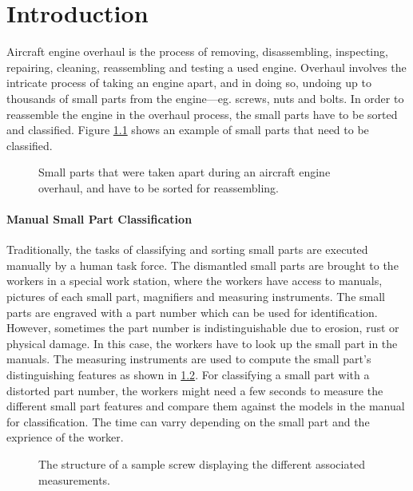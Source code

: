 \chapter{Introduction}\label{ch:introduction}

Aircraft engine overhaul is the process of removing, disassembling, inspecting, repairing, cleaning, reassembling and testing a used engine. Overhaul involves the intricate process of taking an engine apart, and in doing so, undoing up to thousands of small parts from the engine—eg. screws, nuts and bolts. In order to reassemble the engine in the overhaul process, the small parts have to be sorted and classified. Figure \ref{fig:unclassified_small_parts} shows an example of small parts that need to be classified.

\begin{figure}[H]
\centering
{}
\caption{Small parts that were taken apart during an aircraft engine overhaul, and have to be sorted for reassembling.}
\label{fig:unclassified_small_parts}
\end{figure}

\subsubsection{Manual Small Part Classification}

Traditionally, the tasks of classifying and sorting small parts are executed manually by a human task force. The dismantled small parts are brought to the workers in a special work station, where the workers have access to manuals, pictures of each small part, magnifiers and measuring instruments. The small parts are engraved with a part number which can be used for identification. However, sometimes the part number is indistinguishable due to erosion, rust or physical damage. In this case, the workers have to look up the small part in the manuals. The measuring instruments are used to compute the small part's distinguishing features as shown in \ref{fig:small_part_structure}. For classifying a small part with a distorted part number, the workers might need a few seconds to measure the different small part features and compare them against the models in the manual for classification. The time can varry depending on the small part and the exprience of the worker.

\begin{figure}[H]
\centering
{}
\caption{The structure of a sample screw displaying the different associated measurements.}
\label{fig:small_part_structure}
\end{figure}

